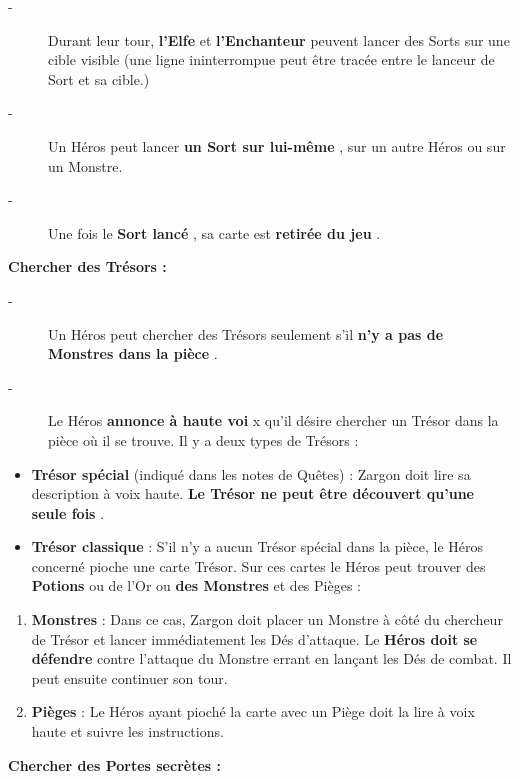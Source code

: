 \documentclass{scrartcl}%
\begin{document}
%
\begin{description}%
\item[{-} ]%
%
 Durant leur tour, %
\textcolor{mygreen}{%
\textbf{l'Elfe}%
}%
\textit{ }%
 et %
\textcolor{mygreen}{%
\textbf{l'Enchanteur}%
}%
\textit{ }%
 peuvent lancer des Sorts sur une cible visible (une ligne ininterrompue peut être tracée entre le lanceur de Sort et sa cible.)
%
\item[{-} ]%
%
 Un Héros peut lancer %
\textcolor{mygreen}{%
\textbf{un Sort sur lui{-}même}%
}%
, sur un autre Héros ou sur un Monstre.
%
\item[{-} ]%
%
 Une fois le %
\textcolor{mygreen}{%
\textbf{Sort lancé}%
}%
, sa carte est %
\textcolor{mygreen}{%
\textbf{retirée du jeu}%
}%
.
%
\end{description}%
\textcolor{mygreen}{%
\textbf{ Chercher des Trésors :}%
}%

%
\begin{description}%
\item[{-} ]%
%
 Un Héros peut chercher des Trésors seulement s'il %
\textcolor{mygreen}{%
\textbf{n'y a pas de Monstres dans la pièce}%
}%
.
%
\item[{-} ]%
%
 Le Héros %
\textcolor{mygreen}{%
\textbf{annonce à haute voi}%
}%
x qu'il désire chercher un Trésor dans la pièce où il se trouve. Il y a deux types de Trésors :
%
\end{description}%
\begin{itemize}%
\item%
%
\textcolor{mygreen}{%
\textbf{Trésor spécial}%
}%
\textit{ }%
 (indiqué dans les notes de Quêtes) : Zargon doit lire sa description à voix haute.%
\textcolor{mygreen}{%
\textbf{ Le Trésor ne peut être découvert qu'une seule fois}%
}%
.
%
\item%
%
\textcolor{mygreen}{%
\textbf{Trésor classique}%
}%
\textit{ }%
 : S'il n'y a aucun Trésor spécial dans la pièce, le Héros concerné pioche une carte Trésor. Sur ces cartes le Héros peut trouver des %
\textcolor{mygreen}{%
\textbf{Potions}%
}%
\textit{ }%
 ou de l'Or ou %
\textcolor{mygreen}{%
\textbf{des Monstres}%
}%
\textit{ }%
 et des Pièges :
%
\end{itemize}%
\begin{enumerate}%
\item%
%
\textcolor{mygreen}{%
\textbf{Monstres}%
}%
\textit{ }%
 : Dans ce cas, Zargon doit placer un Monstre à côté du chercheur de Trésor et lancer immédiatement les Dés d'attaque. Le %
\textcolor{mygreen}{%
\textbf{Héros doit se défendre}%
}%
\textit{ }%
 contre l'attaque du Monstre errant en lançant les Dés de combat. Il peut ensuite continuer son tour.
%
\item%
%
\textcolor{mygreen}{%
\textbf{Pièges}%
}%
\textit{ }%
 : Le Héros ayant pioché la carte avec un Piège doit la lire à voix haute et suivre les instructions. 
%
\end{enumerate}%
\textcolor{mygreen}{%
\textbf{Chercher des Portes secrètes :}%
}%
\end{document}
